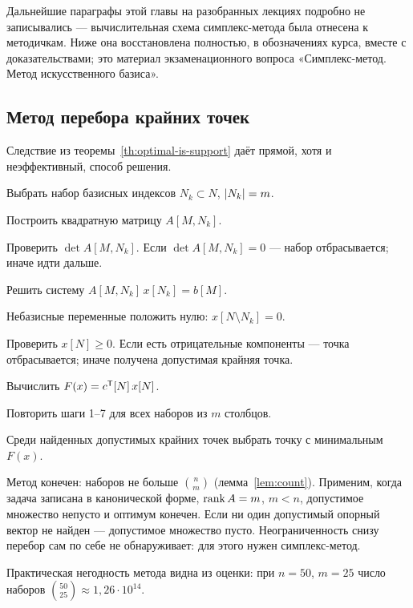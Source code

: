 \begin{idea}[title={Откуда этот материал}]
Дальнейшие параграфы этой главы на разобранных лекциях подробно не
записывались — вычислительная схема симплекс-метода была отнесена к
методичкам. Ниже она восстановлена полностью, в обозначениях курса, вместе с
доказательствами; это материал экзаменационного вопроса «Симплекс-метод.
Метод искусственного базиса».
\end{idea}

\subsection{Метод перебора крайних точек}
\label{subsec:enumeration}

Следствие из теоремы~\ref{th:optimal-is-support} даёт прямой, хотя и
неэффективный, способ решения.

\begin{algo}[title={Перебор крайних точек}]
\begin{steps}
  \item Выбрать набор базисных индексов $N_k \subset N$, $\left\lvert N_k \right\rvert = m$.
  \item Построить квадратную матрицу $A[M, N_k]$.
  \item Проверить $\det A[M,N_k]$. Если $\det A[M,N_k] = 0$ — набор
        отбрасывается; иначе идти дальше.
  \item Решить систему $A[M,N_k]\,x[N_k] = b[M]$.
  \item Небазисные переменные положить нулю: $x[N \setminus N_k] = 0$.
  \item Проверить $x[N] \ge 0$. Если есть отрицательные компоненты — точка
        отбрасывается; иначе получена допустимая крайняя точка.
  \item Вычислить $F(x) = c^{\mathsf{T}}[N]\,x[N]$.
  \item Повторить шаги 1--7 для всех наборов из $m$ столбцов.
  \item Среди найденных допустимых крайних точек выбрать точку с минимальным
        $F(x)$.
\end{steps}
\end{algo}

\begin{idea}
Метод конечен: наборов не больше $\binom{n}{m}$ (лемма~\ref{lem:count}).
Применим, когда задача записана в канонической форме, $\operatorname{rank} A = m$, $m < n$,
допустимое множество непусто и оптимум конечен. Если ни один допустимый
опорный вектор не найден — допустимое множество пусто. Неограниченность снизу
перебор сам по себе не обнаруживает: для этого нужен симплекс-метод.

Практическая негодность метода видна из оценки: при $n = 50$, $m = 25$ число
наборов $\binom{50}{25} \approx 1{,}26\cdot10^{14}$.
\end{idea}

